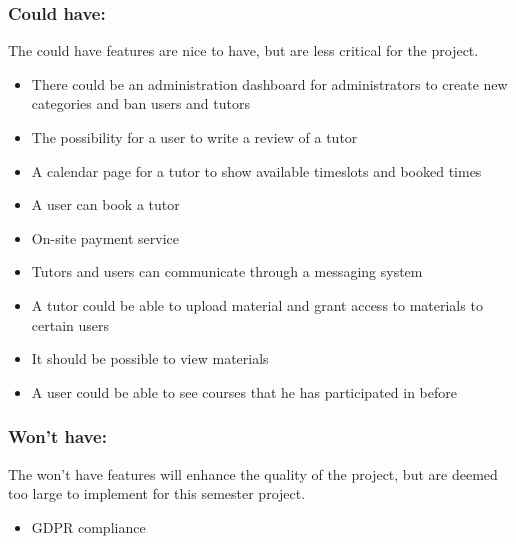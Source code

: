 \subsubsection{Could have:}
The could have features are nice to have, but are less critical for the project.

\begin{itemize}
    \item There could be an administration dashboard for administrators to create new categories and ban users and tutors
    \item The possibility for a user to write a review of a tutor
    \item A calendar page for a tutor to show available timeslots and booked times
    \item A user can book a tutor
    \item On-site payment service
    \item Tutors and users can communicate through a messaging system
    \item A tutor could be able to upload material and grant access to materials to certain users
    \item It should be possible to view materials
    \item A user could be able to see courses that he has participated in before
\end{itemize}

\subsubsection{Won't have:}
The won't have features will enhance the quality of the project, but are deemed too large to implement for this semester project.
\begin{itemize}
    \item GDPR compliance
\end{itemize}
